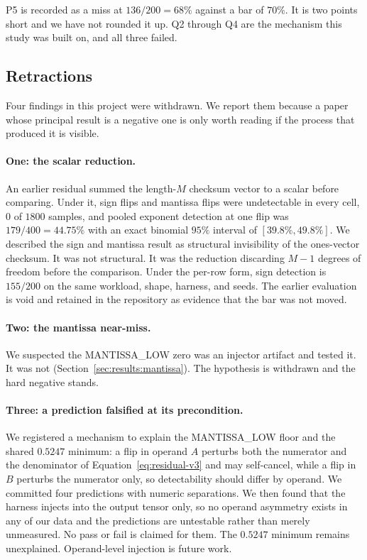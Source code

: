 \documentclass[11pt]{article}
\begin{document}
P5 is recorded as a miss at $136/200 = 68\%$ against a bar of $70\%$. It is
two points short and we have not rounded it up. Q2 through Q4 are the mechanism
this study was built on, and all three failed.

\subsection{Retractions}
\label{sec:results:retractions}

Four findings in this project were withdrawn. We report them because a paper
whose principal result is a negative one is only worth reading if the process
that produced it is visible.

\paragraph{One: the scalar reduction.}
An earlier residual summed the length-$M$ checksum vector to a scalar before
comparing. Under it, sign flips and mantissa flips were undetectable in every
cell, $0$ of $1800$ samples, and pooled exponent detection at one flip was
$179/400 = 44.75\%$ with an exact binomial $95\%$ interval of
$[39.8\%, 49.8\%]$. We described the sign and mantissa result as structural
invisibility of the ones-vector checksum. It was not structural. It was the
reduction discarding $M-1$ degrees of freedom before the comparison. Under the
per-row form, sign detection is $155/200$ on the same workload, shape, harness,
and seeds. The earlier evaluation is void and retained in the repository as
evidence that the bar was not moved.

\paragraph{Two: the mantissa near-miss.}
We suspected the MANTISSA\_LOW zero was an injector artifact and tested it. It
was not (Section~\ref{sec:results:mantissa}). The hypothesis is withdrawn and
the hard negative stands.

\paragraph{Three: a prediction falsified at its precondition.}
We registered a mechanism to explain the MANTISSA\_LOW floor and the shared
$0.5247$ minimum: a flip in operand $A$ perturbs both the numerator and the
denominator of Equation~\ref{eq:residual-v3} and may self-cancel, while a flip
in $B$ perturbs the numerator only, so detectability should differ by operand.
We committed four predictions with numeric separations. We then found that the
harness injects into the output tensor only, so no operand asymmetry exists in
any of our data and the predictions are untestable rather than merely
unmeasured. No pass or fail is claimed for them. The $0.5247$ minimum remains
unexplained. Operand-level injection is future work.
\end{document}
